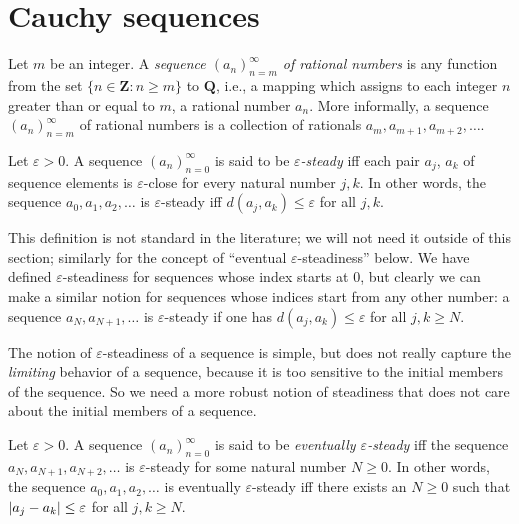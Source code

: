 \section{Cauchy sequences}\label{sec 5.1}

\begin{definition}[Sequences]\label{5.1.1}
Let \(m\) be an integer.
A \emph{sequence \((a_n)_{n = m}^{\infty}\) of rational numbers} is any function from the set \(\{n \in \mathbf{Z} : n \geq m\}\) to \(\mathbf{Q}\), i.e., a mapping which assigns to each integer \(n\) greater than or equal to \(m\), a rational number \(a_n\).
More informally, a sequence \((a_n)_{n = m}^{\infty}\) of rational numbers is a collection of rationals \(a_m, a_{m + 1}, a_{m + 2}, \dots\).
\end{definition}

\setcounter{theorem}{2}
\begin{definition}\label{5.1.3}
Let \(\varepsilon > 0\).
A sequence \((a_n)_{n = 0}^{\infty}\) is said to be \emph{\(\varepsilon\)-steady} iff each pair \(a_j\), \(a_k\) of sequence elements is \(\varepsilon\)-close for every natural number \(j, k\).
In other words, the sequence \(a_0, a_1, a_2, \dots\) is \(\varepsilon\)-steady iff \(d(a_j, a_k) \leq \varepsilon\) for all \(j, k\).
\end{definition}

\begin{remark}\label{5.1.4}
This definition is not standard in the literature;
we will not need it outside of this section;
similarly for the concept of ``eventual \(\varepsilon\)-steadiness'' below.
We have defined \(\varepsilon\)-steadiness for sequences whose index starts at \(0\), but clearly we can make a similar notion for sequences whose indices start from any other number:
a sequence \(a_N, a_{N + 1}, \dots\) is \(\varepsilon\)-steady if one has \(d(a_j, a_k) \leq \varepsilon\) for all \(j, k \geq N\).
\end{remark}

\begin{note}
The notion of \(\varepsilon\)-steadiness of a sequence is simple, but does not really capture the \emph{limiting} behavior of a sequence, because it is too sensitive to the initial members of the sequence.
So we need a more robust notion of steadiness that does not care about the initial members of a sequence.
\end{note}

\setcounter{theorem}{5}
\begin{definition}\label{5.1.6}
Let \(\varepsilon > 0\).
A sequence \((a_n)_{n = 0}^{\infty}\) is said to be \emph{eventually \(\varepsilon\)-steady} iff the sequence \(a_N, a_{N + 1}, a_{N + 2}, \dots\) is \(\varepsilon\)-steady for some natural number \(N \geq 0\).
In other words, the sequence \(a_0, a_1, a_2, \dots\) is eventually \(\varepsilon\)-steady iff there exists an \(N \geq 0\) such that \(\abs*{a_j - a_k} \leq \varepsilon\) for all \(j, k \geq N\).
\end{definition}

